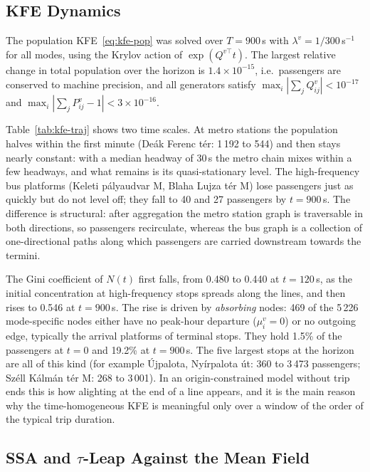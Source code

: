 \documentclass[12pt,a4paper]{article}
\theoremstyle{plain}
\theoremstyle{definition}
\theoremstyle{remark}
\begin{document}


\subsection{KFE Dynamics}

The population KFE~\eqref{eq:kfe-pop} was solved over $T=900$\,s with
$\lambda^v=1/300$\,s$^{-1}$ for all modes, using the Krylov action of
$\exp(Q^{v\top}t)$.  The largest relative change in total population over the
horizon is $1.4\times10^{-15}$, i.e.\ passengers are conserved to machine
precision, and all generators satisfy $\max_i|\sum_j Q^v_{ij}|<10^{-17}$ and
$\max_i|\sum_j P^v_{ij}-1|<3\times10^{-16}$.



Table~\ref{tab:kfe-traj} shows two time scales.  At metro stations the
population halves within the first minute (De\'ak Ferenc t\'er: 1\,192 to 544)
and then stays nearly constant: with a median headway of 30\,s the metro chain
mixes within a few headways, and what remains is its quasi-stationary level.
The high-frequency bus platforms (Keleti p\'alyaudvar M, Blaha Lujza t\'er M)
lose passengers just as quickly but do not level off; they fall to 40 and 27
passengers by $t=900$\,s.  The difference is structural: after aggregation the
metro station graph is traversable in both directions, so passengers
recirculate, whereas the bus graph is a collection of one-directional paths
along which passengers are carried downstream towards the termini.

The Gini coefficient of $N(t)$ first falls, from 0.480 to 0.440 at
$t=120$\,s, as the initial concentration at high-frequency stops spreads
along the lines, and then rises to 0.546 at $t=900$\,s.  The rise is driven
by \emph{absorbing} nodes: 469 of the 5\,226 mode-specific nodes either have no
peak-hour departure ($\mu^v_i=0$) or no outgoing edge, typically the arrival
platforms of terminal stops.  They hold 1.5\% of the passengers at $t=0$ and
19.2\% at $t=900$\,s.  The five largest stops at the horizon are all of this
kind (for example \'Ujpalota, Ny\'irpalota \'ut: 360 to 3\,473 passengers;
Sz\'ell K\'alm\'an t\'er M: 268 to 3\,001).  In an origin-constrained model
without trip ends this is how alighting at the end of a line appears, and it
is the main reason why the time-homogeneous KFE is meaningful only over a
window of the order of the typical trip duration.

\subsection{SSA and $\tau$-Leap Against the Mean Field}
\end{document}
